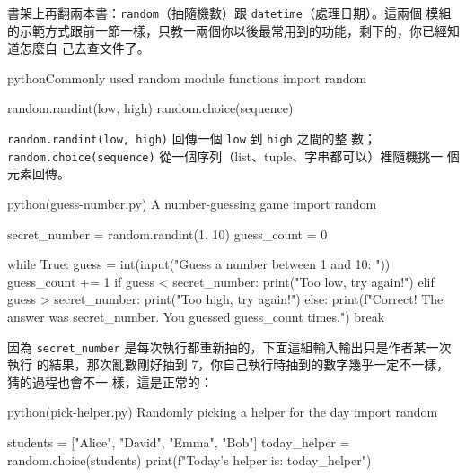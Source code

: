 書架上再翻兩本書：\texttt{random}（抽隨機數）跟 \texttt{datetime}（處理日期）。這兩個
模組的示範方式跟前一節一樣，只教一兩個你以後最常用到的功能，剩下的，你已經知道怎麼自
己去查文件了。

\begin{code}{python}{Commonly used random module functions}
import random

random.randint(low, high)
random.choice(sequence)
\end{code}

\texttt{random.randint(low, high)} 回傳一個 \texttt{low} 到 \texttt{high} 之間的整
數；
\texttt{random.choice(sequence)} 從一個序列（list、tuple、字串都可以）裡隨機挑一
個元素回傳。


\begin{example}{python}{(guess-number.py) A number-guessing game}
import random

secret_number = random.randint(1, 10)
guess_count = 0

while True:
    guess = int(input("Guess a number between 1 and 10: "))
    guess_count += 1
    if guess < secret_number:
        print("Too low, try again!")
    elif guess > secret_number:
        print("Too high, try again!")
    else:
        print(f"Correct! The answer was {secret_number}. You guessed {guess_count} times.")
        break
\end{example}

因為 \texttt{secret\_number} 是每次執行都重新抽的，下面這組輸入輸出只是作者某一次執行
的結果，那次亂數剛好抽到 7，你自己執行時抽到的數字幾乎一定不一樣，猜的過程也會不一
樣，這是正常的：


\begin{example}{python}{(pick-helper.py) Randomly picking a helper for the day}
import random

students = ["Alice", "David", "Emma", "Bob"]
today_helper = random.choice(students)
print(f"Today's helper is: {today_helper}")
\end{example}

